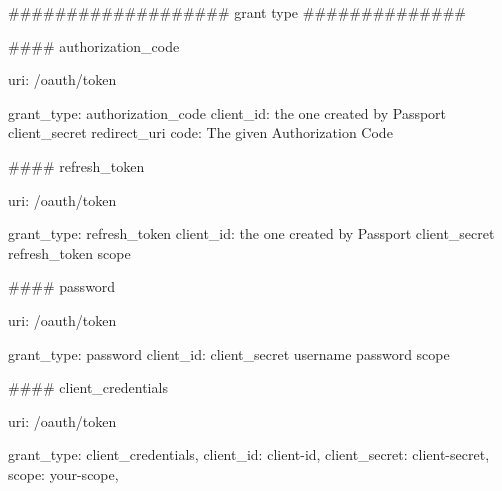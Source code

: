 ################### grant type ##############

#### authorization_code

    uri: /oauth/token

    grant_type: authorization_code
    client_id: the one created by Passport
    client_secret
    redirect_uri
    code: The given Authorization Code

#### refresh_token

    uri: /oauth/token

    grant_type: refresh_token
    client_id: the one created by Passport
    client_secret
    refresh_token
    scope

#### password

    uri: /oauth/token

    grant_type: password
    client_id:
    client_secret
    username
    password
    scope

#### client_credentials

    uri: /oauth/token

    grant_type: client_credentials,
    client_id: client-id,
    client_secret: client-secret,
    scope: your-scope,
